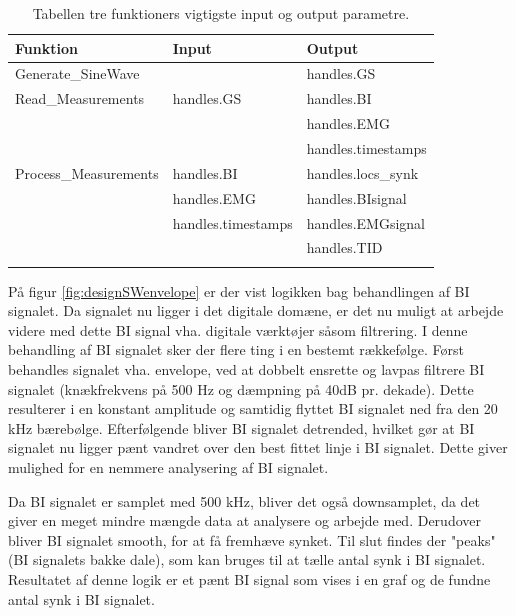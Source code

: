\begin{table}[H]
\center
\begin{tabularx}{\linewidth}{l  X  X}
     \textbf{Funktion}	&	\textbf{Input}		&	\textbf{Output} \\ \midrule
     Generate\_SineWave   	&		&	handles.GS\\   \addlinespace[2mm]\hline\addlinespace[2mm]
Read\_Measurements	&	handles.GS	&	handles.BI\\   \addlinespace[2mm]
			    &		&	handles.EMG\\   \addlinespace[2mm]
			    &		&	handles.timestamps\\   \addlinespace[2mm]\hline\addlinespace[2mm]
			    Process\_Measurements    &	handles.BI	&	handles.locs\_synk\\   \addlinespace[2mm]
						&	handles.EMG	&	handles.BIsignal\\   \addlinespace[2mm]
						&	handles.timestamps	&	handles.EMGsignal\\   \addlinespace[2mm]
						&	& handles.TID	\\   \addlinespace[2mm]\hline\addlinespace[2mm]
						 \bottomrule                                                                                                                   
    \end{tabularx}
    \caption {Tabellen tre funktioners vigtigste input og output parametre.}
    \label{tab:SWinputoutput}
	
\end{table}

På figur \ref{fig:designSWenvelope} er der vist logikken bag behandlingen af BI signalet. Da signalet nu ligger i det digitale domæne, er det nu muligt at arbejde videre med dette BI signal vha. digitale værktøjer såsom filtrering. I denne behandling af BI signalet sker der flere ting i en bestemt rækkefølge. Først behandles signalet vha. envelope, ved at dobbelt ensrette og lavpas filtrere BI signalet (knækfrekvens på 500 Hz og dæmpning på 40dB pr. dekade). Dette resulterer i en konstant amplitude og samtidig flyttet BI signalet ned fra den 20 kHz bærebølge. Efterfølgende bliver BI signalet detrended, hvilket gør at BI signalet nu ligger pænt vandret over den best fittet linje i BI signalet. Dette giver mulighed for en nemmere analysering af BI signalet. 

Da BI signalet er samplet med 500 kHz, bliver det også downsamplet, da det giver en meget mindre mængde data at analysere og arbejde med. Derudover bliver BI signalet smooth, for at få fremhæve synket. Til slut findes der "peaks" (BI signalets bakke dale), som kan bruges til at tælle antal synk i BI signalet. Resultatet af denne logik er et pænt BI signal som vises i en graf og de fundne antal synk i BI signalet. 

